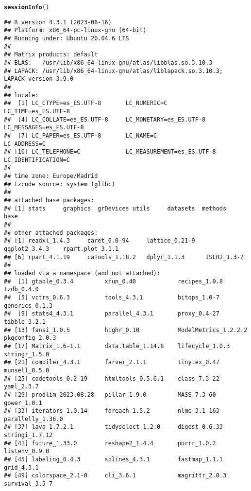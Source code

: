 \documentclass{article}\usepackage[]{graphicx}\usepackage[]{xcolor}
\makeatletter
\newcommand{\hlstd}[1]{\textcolor[rgb]{0.345,0.345,0.345}{#1}}%
\newcommand{\hlkwd}[1]{\textcolor[rgb]{0.737,0.353,0.396}{\textbf{#1}}}%
\newenvironment{kframe}{%
 \def\at@end@of@kframe{}%
 \ifinner\ifhmode%
  \def\at@end@of@kframe{\end{minipage}}%
  \begin{minipage}{\columnwidth}%
 \fi\fi%
 \def\FrameCommand##1{\hskip\@totalleftmargin \hskip-\fboxsep
 \colorbox{shadecolor}{##1}\hskip-\fboxsep
     \hskip-\linewidth \hskip-\@totalleftmargin \hskip\columnwidth}%
 \MakeFramed {\advance\hsize-\width
   \@totalleftmargin\z@ \linewidth\hsize
   \@setminipage}}%
 {\par\unskip\endMakeFramed%
 \at@end@of@kframe}
\newenvironment{knitrout}{}{} %
\makeatother
\begin{document}
\begin{knitrout}
\color{fgcolor}\begin{kframe}
\begin{alltt}
\hlkwd{sessionInfo}\hlstd{()}
\end{alltt}
\begin{verbatim}
## R version 4.3.1 (2023-06-16)
## Platform: x86_64-pc-linux-gnu (64-bit)
## Running under: Ubuntu 20.04.6 LTS
## 
## Matrix products: default
## BLAS:   /usr/lib/x86_64-linux-gnu/atlas/libblas.so.3.10.3 
## LAPACK: /usr/lib/x86_64-linux-gnu/atlas/liblapack.so.3.10.3;  LAPACK version 3.9.0
## 
## locale:
##  [1] LC_CTYPE=es_ES.UTF-8       LC_NUMERIC=C               LC_TIME=es_ES.UTF-8       
##  [4] LC_COLLATE=es_ES.UTF-8     LC_MONETARY=es_ES.UTF-8    LC_MESSAGES=es_ES.UTF-8   
##  [7] LC_PAPER=es_ES.UTF-8       LC_NAME=C                  LC_ADDRESS=C              
## [10] LC_TELEPHONE=C             LC_MEASUREMENT=es_ES.UTF-8 LC_IDENTIFICATION=C       
## 
## time zone: Europe/Madrid
## tzcode source: system (glibc)
## 
## attached base packages:
## [1] stats     graphics  grDevices utils     datasets  methods   base     
## 
## other attached packages:
## [1] readxl_1.4.3     caret_6.0-94     lattice_0.21-9   ggplot2_3.4.3    rpart.plot_3.1.1
## [6] rpart_4.1.19     caTools_1.18.2   dplyr_1.1.3      ISLR2_1.3-2     
## 
## loaded via a namespace (and not attached):
##  [1] gtable_0.3.4         xfun_0.40            recipes_1.0.8        tzdb_0.4.0          
##  [5] vctrs_0.6.3          tools_4.3.1          bitops_1.0-7         generics_0.1.3      
##  [9] stats4_4.3.1         parallel_4.3.1       proxy_0.4-27         tibble_3.2.1        
## [13] fansi_1.0.5          highr_0.10           ModelMetrics_1.2.2.2 pkgconfig_2.0.3     
## [17] Matrix_1.6-1.1       data.table_1.14.8    lifecycle_1.0.3      stringr_1.5.0       
## [21] compiler_4.3.1       farver_2.1.1         tinytex_0.47         munsell_0.5.0       
## [25] codetools_0.2-19     htmltools_0.5.6.1    class_7.3-22         yaml_2.3.7          
## [29] prodlim_2023.08.28   pillar_1.9.0         MASS_7.3-60          gower_1.0.1         
## [33] iterators_1.0.14     foreach_1.5.2        nlme_3.1-163         parallelly_1.36.0   
## [37] lava_1.7.2.1         tidyselect_1.2.0     digest_0.6.33        stringi_1.7.12      
## [41] future_1.33.0        reshape2_1.4.4       purrr_1.0.2          listenv_0.9.0       
## [45] labeling_0.4.3       splines_4.3.1        fastmap_1.1.1        grid_4.3.1          
## [49] colorspace_2.1-0     cli_3.6.1            magrittr_2.0.3       survival_3.5-7      

\end{verbatim}
\end{kframe}
\end{knitrout}
\end{document}
